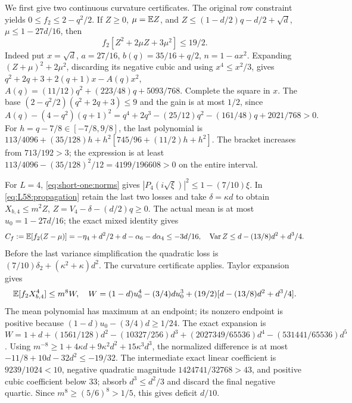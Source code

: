 We first give two continuous curvature certificates.
The original row constraint yields $0\le f_2\le2-q^2/2$.
If $Z\ge0$, $\mu=\mathbb E Z$, and
$Z\le(1-d/2)q-d/2+\sqrt d$, $\mu\le1-27d/16$, then
\begin{equation}\tag{L58.8.3}\label{eq:L58:curvature19}
f_2[Z^2+2\mu Z+3\mu^2]\le19/2.
\end{equation}
Indeed put $x=\sqrt d$, $a=27/16$, $b(q)=35/16+q/2$,
$n=1-ax^2$. Expanding $(Z+\mu)^2+2\mu^2$, discarding its negative
cubic and using $x^4\le x^2/3$, gives
$q^2+2q+3+2(q+1)x-A(q)x^2$,
$A(q)=(11/12)q^2+(223/48)q+5093/768$.
Complete the square in $x$. The base
$(2-q^2/2)(q^2+2q+3)\le9$ and the gain is at most $1/2$, since
\[
A(q)-(4-q^2)(q+1)^2
=q^4+2q^3-(25/12)q^2-(161/48)q+2021/768>0.
\]
For $h=q-7/8\in[-7/8,9/8]$, the last polynomial is
$113/4096+(35/128)h+h^2[745/96+(11/2)h+h^2]$.
The bracket increases from $713/192>3$; the expression is at least
$113/4096-(35/128)^2/12=4199/196608>0$ on the entire interval.

For \(L=4\), \eqref{eq:short-one:norms} gives
\(|P_4(i\sqrt\xi)|^2\le1-(7/10)\xi\).
In \eqref{eq:L58:propagation} retain the last two losses and take
$\delta=\kappa d$ to obtain
$X_{b,4}\le m^2Z$, $Z=V_4-\delta-(d/2)q\ge0$.
The actual mean is at most $u_0=1-27d/16$; the exact mixed identity
gives
\[
C_f:=\mathbb E[f_2(Z-\mu)]
=-\eta_4+d^2/2+d-\alpha_6-d\alpha_4\le-3d/16,
\quad\operatorname{Var}Z\le d-(13/8)d^2+d^3/4.
\]
Before the last variance simplification the quadratic loss is
$(7/10)\delta_2+(\kappa^2+\kappa)d^2$.
The curvature certificate applies. Taylor expansion gives
\[
\mathbb E[f_2X_{b,4}^4]\le m^8W,
\quad W=(1-d)u_0^4-(3/4)du_0^3
+(19/2)[d-(13/8)d^2+d^3/4].
\]
The mean polynomial has maximum at an endpoint; its nonzero endpoint
is positive because $(1-d)u_0-(3/4)d\ge1/24$.
The exact expansion is
$W=1+d+(1561/128)d^2-(10327/256)d^3
+(2027349/65536)d^4-(531441/65536)d^5$.
Using $m^{-8}\ge1+4\kappa d+9\kappa^2d^2+15\kappa^3d^3$,
the normalized difference is at most
$-11/8+10d-32d^2\le-19/32$.
The intermediate exact linear coefficient is $9239/1024<10$,
negative quadratic magnitude $1424741/32768>43$, and positive cubic
coefficient below $33$; absorb $d^3\le d^2/3$ and discard the final
negative quartic. Since $m^8\ge(5/6)^8>1/5$, this gives deficit $d/10$.

